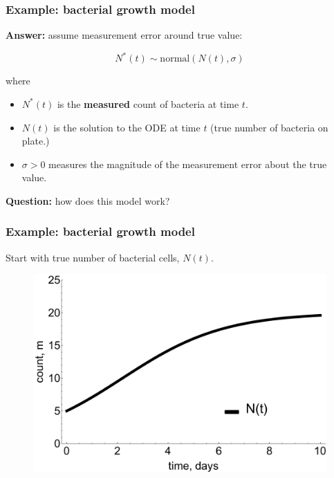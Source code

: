 \documentclass[handout]{beamer}
\begin{document}
\begin{frame}
	\frametitle{Example: bacterial growth model}
	\textbf{Answer:} assume measurement error around true value:
	
	\begin{equation}
	N^*(t) \sim \text{normal}(N(t), \sigma)
	\end{equation}

where
\begin{itemize}
	\item<5-> $N^*(t)$ is the \textbf{measured} count of bacteria at time $t$.
	\item<6-> $N(t)$ is the solution to the ODE at time $t$ (true number of bacteria on plate.)
	\item<7-> $\sigma>0$ measures the magnitude of the measurement error about the true value.
\end{itemize}

 \textbf{Question:} how does this model work?

\end{frame}

\begin{frame}
	\frametitle{Example: bacterial growth model}
	Start with true number of bacterial cells, $N(t)$.
	
		\begin{figure}[ht]
			\centerline{\includegraphics[width=1\textwidth]{figures/lec7_odeSingleBulding1.pdf}}
		\end{figure}
	
\end{frame}
\end{document}
